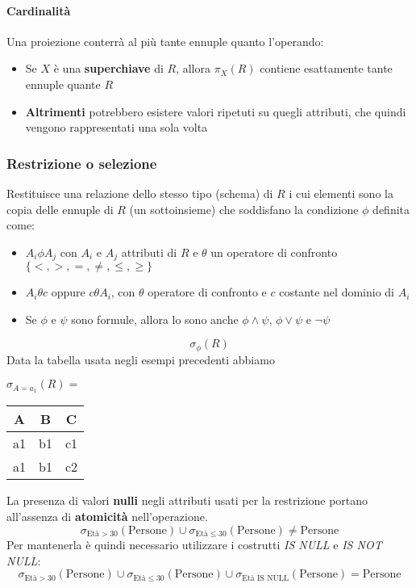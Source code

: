 \paragraph{Cardinalità}
Una proiezione conterrà al più tante ennuple quanto l'operando:
\begin{itemize}
	\item  Se $X$ è una \textbf{superchiave} di $R$, allora $\pi_X(R)$ contiene esattamente tante ennuple quante $R$
	\item \textbf{Altrimenti} potrebbero esistere valori ripetuti su quegli attributi, che quindi vengono rappresentati una sola volta
\end{itemize}

\subsubsection{Restrizione o selezione}
Restituisce una relazione dello stesso tipo (schema) di $R$ i cui elementi sono la copia delle ennuple di $R$ (un sottoinsieme) che soddisfano la condizione $\phi$ definita come:
\begin{itemize}
	\item $A_i \phi A_j$ con $A_i$ e $A_j$ attributi di $R$ e $\theta$ un operatore di confronto $\{<, >, =, \neq, \leq, \geq \}$
	\item $A_i \theta c$ oppure $c \theta A_i$, con $\theta$ operatore di confronto e $c$ costante nel dominio di $A_i$
	\item Se $\phi$ e $\psi$ sono formule, allora lo sono anche $\phi \land \psi$, $\phi \lor \psi$ e $\neg \psi$
\end{itemize}
\begin{equation}
	\sigma_\phi(R)
\end{equation}
Data la tabella usata negli esempi precedenti abbiamo
\begin{table}[!h]
	\centering
	$\sigma_{A=a_1}(R)=$ \hspace{10pt}
	\begin{tabular}{|c|c|c|}
		\hline
		\textbf{A} & \textbf{B} & \textbf{C}\\ 
		\hline
		a1 & b1 & c1\\
		\hline
		a1 & b1 & c2\\
		\hline
	\end{tabular}
\end{table}

\begin{observation}
	La presenza di valori \textbf{nulli} negli attributi usati per la restrizione portano all'assenza di \textbf{atomicità} nell'operazione.
	\begin{equation*}
		\sigma_{\text{Età}>30}(\text{Persone}) \cup \sigma_{\text{Età}\leq30}(\text{Persone}) \neq \text{Persone}
	\end{equation*}
	Per mantenerla è quindi necessario utilizzare i costrutti \textit{IS NULL} e \textit{IS NOT NULL}:
	\begin{equation*}
		\sigma_{\text{Età}>30}(\text{Persone}) \cup \sigma_{\text{Età}\leq30}(\text{Persone}) \cup \sigma_{\text{Età IS NULL}}(\text{Persone}) = \text{Persone}
	\end{equation*}
\end{observation}


